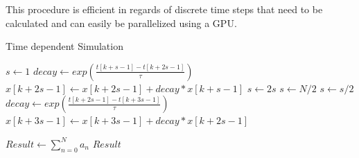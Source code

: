 This procedure is efficient in regards of discrete time steps that need to be calculated and can easily be parallelized using a GPU.


\begin{algorithm}
	\caption{Time dependent Simulation}\label{timesim}
	\begin{algorithmic}
		\State $s \gets 1$
				\State $decay \gets exp\left(\frac{t[k+s-1]-t[k+2s-1]}{\tau}\right)$ 
				\State $x[k+2s-1] \gets x[k+2s-1] + decay*x[k+s-1]$				
			\EndFor
			\State $s \gets 2s$ 
		\EndWhile
		\State $s \gets N/2$
			\State $s \gets s/2$
				\State $decay \gets exp\left(\frac{t[k+2s-1]-t[k+3s-1]}{\tau}\right)$
				\State $x[k+3s-1] \gets x[k+3s-1] + decay*x[k+2s-1]$
			\EndFor
		\EndWhile
	\EndProcedure
	
	\Function{Simulation}{Atom positions $x \in \mathbb{R}^{Nx3}$,  Detector position $y \in \mathbb{R}^{3}$, \newline Initial Phases $\phi \in [0,2\pi)^N$, Emission Times $t_0 \in \mathbb{R}^N$, $\tau\ \in \mathbb{R}$}
	\State	{}
	\State	{}
	\State 	{}
	\State $Result \gets \sum_{n=0}^N a_n$
	\State \Return $Result$
	\EndFunction
	
	\end{algorithmic}
\label{algo:td}
\end{algorithm}

